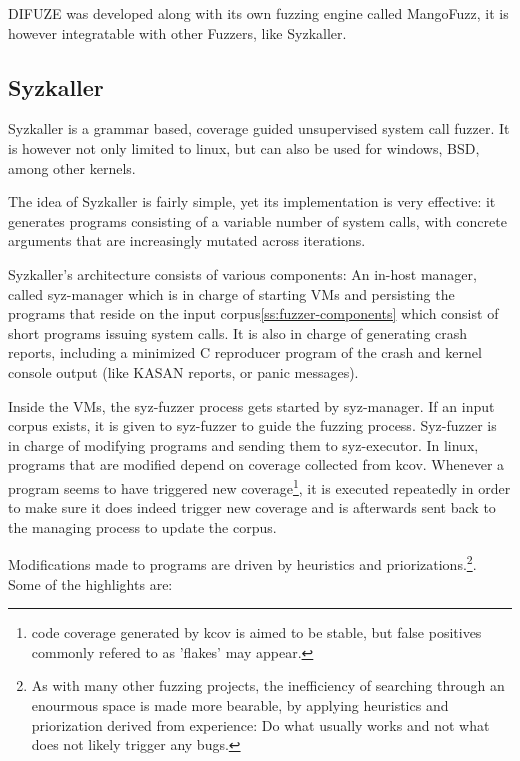 DIFUZE was developed along with its own fuzzing engine called MangoFuzz, it is however integratable with other Fuzzers, like Syzkaller.



\subsection{Syzkaller}

Syzkaller is a grammar based, coverage guided unsupervised
system call fuzzer. It is however not only
limited to linux, but can also be used for windows, BSD, among other
kernels.

The idea of Syzkaller is fairly simple, yet its implementation is very effective: it generates
programs consisting of a variable number of system calls, with
concrete arguments that are increasingly mutated across iterations.


Syzkaller's architecture consists of various components: An in-host manager, called
syz-manager which is in charge of starting VMs and persisting the programs that
reside on the input corpus\ref{ss:fuzzer-components} which consist of short programs issuing
system calls. It is also in charge of generating crash reports, including a minimized C reproducer program of the crash and kernel console output (like KASAN reports, or panic
messages).

Inside the VMs, the syz-fuzzer process gets started by syz-manager. If an input
corpus exists, it is given to syz-fuzzer to guide the fuzzing process. Syz-fuzzer is
in charge of modifying programs and sending them to syz-executor. In linux, programs that
are modified depend on coverage collected from kcov. Whenever a program seems to have triggered new coverage\footnote{code coverage generated by kcov is aimed to be stable, but false positives commonly refered to as 'flakes' may appear.},
it is executed repeatedly in order to make sure it does indeed trigger new coverage and is
afterwards sent back to the managing process to update the corpus.

Modifications made to programs are driven by heuristics and priorizations.\footnote{As with many other fuzzing projects, the inefficiency of searching through an enourmous space is made more bearable, by applying heuristics and priorization derived from experience: Do what usually works and not what does not likely trigger any bugs.}. Some of the highlights are\cite{vyukovSyzkallerAdventuresContinuous2020}:

